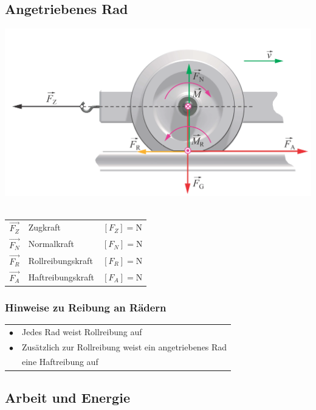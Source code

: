 	
	
	
	\subsection{Angetriebenes Rad}
	
	\includegraphics[width=0.8\linewidth]{Bilder/antriebsrad} \\
	\\

	\begin{tabular}{c l c}
	$\vec{F_Z}$ & Zugkraft & $[F_Z] = \mathrm{N}$ \\
	$\vec{F_N}$ & Normalkraft & $[F_N] = \mathrm{N}$ \\
	$\vec{F_R}$ & Rollreibungskraft & $[F_R] = \mathrm{N}$ \\
	$\vec{F_A}$ & Haftreibungskraft & $[F_A] = \mathrm{N}$ \\
	\end{tabular}
	
	
	
	\subsubsection{Hinweise zu Reibung an Rädern}
	
	\begin{tabular}{ll}
	$\bullet$ & Jedes Rad weist Rollreibung auf \\
	$\bullet$ & Zusätzlich zur Rollreibung weist ein angetriebenes Rad \\
	& eine Haftreibung auf \\
	\end{tabular}
	




	
	\subsection{Arbeit und Energie}
	
